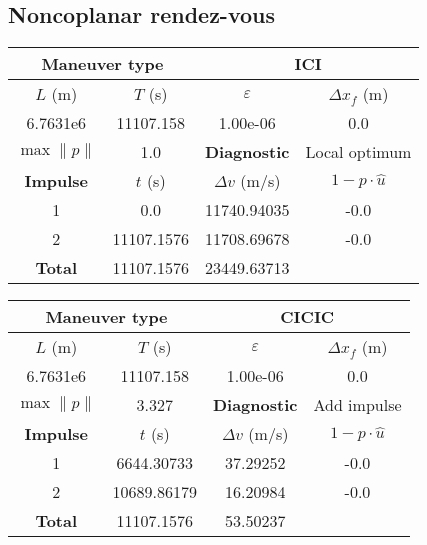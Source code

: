 \subsection{Noncoplanar rendez-vous}


\begin{table}[htpb]
    \centering
    \begin{tabular}{cccc} \toprule
    \multicolumn{2}{c}{\textbf{Maneuver type}} & \multicolumn{2}{c}{ICI} \\ \midrule
    \(L\) (m) & \(T\) (s) & \(\varepsilon\) & \(\Delta x_{f}\) (m)    \\ \midrule
    6.7631e6          & 11107.158          & 1.00e-06                & 0.0                        \\ \midrule
    \(\max \lVert p \rVert\) & 1.0     & \textbf{Diagnostic}   & Local optimum        \\ \midrule
    \textbf{Impulse} & \(t\) (s) & \(\Delta v\) (m/s) & \(1 - p \cdot \hat{u}\) \\ \midrule
    1                 & 0.0          & 11740.94035             & -0.0                    \\
    2                 & 11107.1576          & 11708.69678             & -0.0                    \\\midrule
    \textbf{Total}   & 11107.1576          & 23449.63713             &                     \\ \bottomrule   
    \end{tabular}
\end{table}


\begin{table}[htpb]
    \centering
    \begin{tabular}{cccc} \toprule
    \multicolumn{2}{c}{\textbf{Maneuver type}} & \multicolumn{2}{c}{CICIC} \\ \midrule
    \(L\) (m) & \(T\) (s) & \(\varepsilon\) & \(\Delta x_{f}\) (m)    \\ \midrule
    6.7631e6          & 11107.158          & 1.00e-06                & 0.0                        \\ \midrule
    \(\max \lVert p \rVert\) & 3.327     & \textbf{Diagnostic}   & Add impulse        \\ \midrule
    \textbf{Impulse} & \(t\) (s) & \(\Delta v\) (m/s) & \(1 - p \cdot \hat{u}\) \\ \midrule
    1                 & 6644.30733          & 37.29252             & -0.0                    \\
    2                 & 10689.86179          & 16.20984             & -0.0                    \\\midrule
    \textbf{Total}   & 11107.1576          & 53.50237             &                     \\ \bottomrule   
    \end{tabular}
\end{table}


